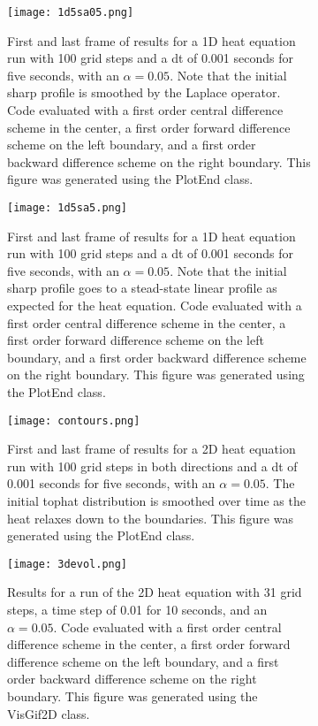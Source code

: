 \documentclass{article}
\begin{document}
	\begin{figure}
		\centering
		\begin{subfigure}[t]{0.47\textwidth}
			\centering
			\texttt{[image: 1d5sa05.png]}
			\caption{First and last frame of results for a 1D heat equation run with 100 grid steps and a dt of 0.001 seconds for five seconds, with an $\alpha = 0.05$. Note that the initial sharp profile is smoothed by the Laplace operator. Code evaluated with a first order central difference scheme in the center, a first order forward difference scheme on the left boundary, and a first order backward difference scheme on the right boundary. This figure was generated using the PlotEnd class.}
		\end{subfigure} \hfill
		\begin{subfigure}[t]{0.47\textwidth}
			\centering
			\texttt{[image: 1d5sa5.png]}
			\caption{First and last frame of results for a 1D heat equation run with 100 grid steps and a dt of 0.001 seconds for five seconds, with an $\alpha = 0.05$. Note that the initial sharp profile goes to a stead-state linear profile as expected for the heat equation. Code evaluated with a first order central difference scheme in the center, a first order forward difference scheme on the left boundary, and a first order backward difference scheme on the right boundary. This figure was generated using the PlotEnd class.}
		\end{subfigure}
		\caption{}
	\label{fig:1d}
	\end{figure}
	\begin{figure} 
		\centering
		\begin{subfigure}[t]{0.47\textwidth}
			\centering
			\texttt{[image: contours.png]}
			\caption{First and last frame of results for a 2D heat equation run with 100 grid steps in both directions and a dt of 0.001 seconds for five seconds, with an $\alpha = 0.05$. The initial tophat distribution is smoothed over time as the heat relaxes down to the boundaries. This figure was generated using the PlotEnd class.}
		\end{subfigure} \hfill
		\begin{subfigure}[t]{0.47\textwidth}
			\centering
			\texttt{[image: 3devol.png]}
			\caption{Results for a run of the 2D heat equation with 31 grid steps, a time step of 0.01 for 10 seconds, and an $\alpha = 0.05$.  Code evaluated with a first order central difference scheme in the center, a first order forward difference scheme on the left boundary, and a first order backward difference scheme on the right boundary. This figure was generated using the VisGif2D class.}
		\end{subfigure}
		\caption{}
	\label{fig:2d}
	\end{figure}
\end{document}
